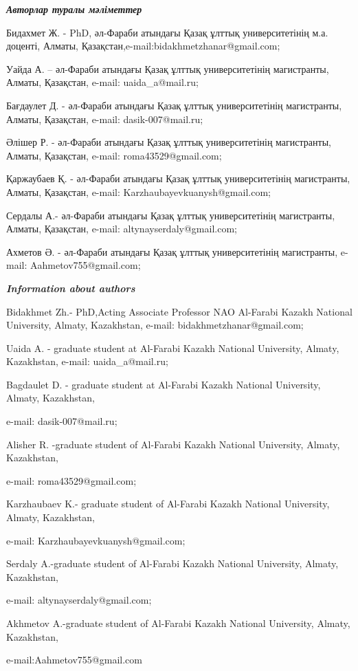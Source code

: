 \emph{{\bfseries Авторлар туралы мәліметтер}}

\begin{noparindent}
Бидахмет Ж. - PhD, әл-Фараби атындағы Қазақ ұлттық университетінің м.а.
доценті, Алматы, Қазақстан,e-mail:bidakhmetzhanar@gmail.com;

Уайда А. -- әл-Фараби атындағы Қазақ ұлттық университетінің магистранты,
Алматы, Қазақстан, e-mail: uaida\_a@mail.ru;

Бағдаулет Д. - әл-Фараби атындағы Қазақ ұлттық университетінің
магистранты, Алматы, Қазақстан, e-mail: dasik-007@mail.ru;

Әлішер Р. - әл-Фараби атындағы Қазақ ұлттық университетінің магистранты,
Алматы, Қазақстан, e-mail: roma43529@gmail.com;

Қаржаубаев Қ. - әл-Фараби атындағы Қазақ ұлттық университетінің
магистранты, Алматы, Қазақстан, e-mail: Karzhaubayevkuanysh@gmail.com;

Сердалы А.- әл-Фараби атындағы Қазақ ұлттық университетінің магистранты,
Алматы, Қазақстан, e-mail: altynayserdaly@gmail.com;

Ахметов Ә. - әл-Фараби атындағы Қазақ ұлттық университетінің
магистранты, e-mail: Aahmetov755@gmail.com;
\end{noparindent}

\emph{{\bfseries Information about authors}}

\begin{noparindent}
Bidakhmet Zh.- PhD,Acting Associate Professor NAO Al-Farabi Kazakh
National University, Almaty, Kazakhstan, e-mail:
bidakhmetzhanar@gmail.com;

Uaida A. - graduate student at Al-Farabi Kazakh National University,
Almaty, Kazakhstan, e-mail: uaida\_a@mail.ru;

Bagdaulet D. - graduate student at Al-Farabi Kazakh National University,
Almaty, Kazakhstan,

e-mail: dasik-007@mail.ru;

Alisher R. -graduate student of Al-Farabi Kazakh National University,
Almaty, Kazakhstan,

e-mail: roma43529@gmail.com;

Karzhaubaev K.- graduate student of Al-Farabi Kazakh National
University, Almaty, Kazakhstan,

e-mail: Karzhaubayevkuanysh@gmail.com;

Serdaly A.-graduate student of Al-Farabi Kazakh National University,
Almaty, Kazakhstan,

e-mail: altynayserdaly@gmail.com;

Akhmetov A.-graduate student of Al-Farabi Kazakh National University,
Almaty, Kazakhstan,

e-mail:Aahmetov755@gmail.com
\end{noparindent}
